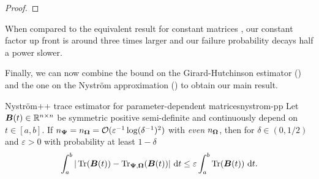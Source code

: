 \documentclass[12pt]{article}
\begin{document}
\begin{proof}
\end{proof}

When compared to the equivalent result for constant matrices \cite[Lemma 3.2]{persson-2022-improved-variants}, our constant factor up front is around three times larger and our failure probability decays half a power slower.

Finally, we can now combine the bound on the Girard-Hutchinson estimator () and the one on the Nyström approximation () to obtain our main result.

\begin{theorem}{Nyström++ trace estimator for parameter-dependent matrices}{nystrom-pp}
    Let $\boldsymbol{B}(t) \in \mathbb{R}^{n \times n}$ be symmetric positive semi-definite and continuously depend on $t \in [a, b]$. If $n_{\boldsymbol{\Psi}} = n_{\boldsymbol{\Omega}} = \mathcal{O}(\varepsilon^{-1} \log(\delta^{-1})^2)$ with \emph{even} $n_{\boldsymbol{\Omega}}$, then for $\delta \in (0, 1/2)$ and $\varepsilon > 0$ with probability at least $1 - \delta$ 
    \begin{equation}
        \int_{a}^{b} | \operatorname{Tr}(\boldsymbol{B}(t)) - \operatorname{Tr}_{\boldsymbol{\Psi}, \boldsymbol{\Omega}}(\boldsymbol{B}(t)) |~\mathrm{d}t
        \leq \varepsilon \int_{a}^{b} \operatorname{Tr}(\boldsymbol{B}(t))~\mathrm{d}t.
    \end{equation}
\end{theorem}
\end{document}
